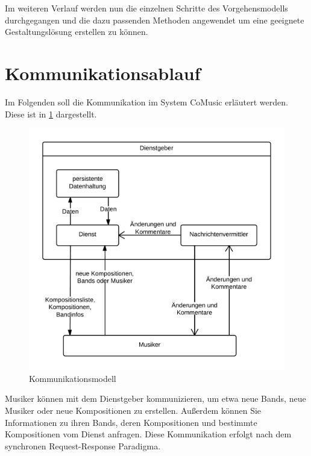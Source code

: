 \documentclass[12pt]{scrartcl}
\begin{document}
Im weiteren Verlauf werden nun die einzelnen Schritte des Vorgehensmodells durchgegangen und die dazu passenden Methoden angewendet um eine geeignete Gestaltungslösung erstellen zu können.


\section{Kommunikationsablauf}



Im Folgenden soll die Kommunikation im System CoMusic erläutert werden. Diese ist in \ref{fig:kommunikationsmodell} dargestellt.

\begin{figure}[H]
\centering
\includegraphics[scale=.25]{figures/kommunikationsmodell}
\caption{Kommunikationsmodell}
\label{fig:kommunikationsmodell}
\end{figure}

Musiker können mit dem Dienstgeber kommunizieren, um etwa neue Bands, neue Musiker oder neue Kompositionen zu erstellen. Außerdem können Sie Informationen zu ihren Bands, deren Kompositionen und bestimmte Kompositionen vom Dienst anfragen. Diese Kommunikation erfolgt nach dem synchronen Request-Response Paradigma.
\end{document}
